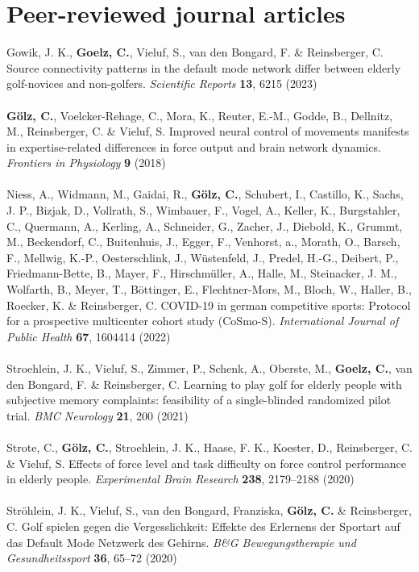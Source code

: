 \section*{Peer-reviewed journal articles}
Gowik, J. K., \textbf{Goelz, C.}, Vieluf, S., van den Bongard, F. \& Reinsberger, C. Source connectivity patterns in the default mode network differ between elderly golf-novices and non-golfers. \textit{Scientific Reports} \textbf{13}, 6215 (2023)\\
\\
\noindent\textbf{Gölz, C.}, Voelcker-Rehage, C., Mora, K., Reuter, E.-M., Godde, B., Dellnitz, M., Reinsberger, C. \& Vieluf, S. Improved neural control of movements manifests in expertise-related differences in force output and brain network dynamics. \textit{Frontiers in Physiology} \textbf{9} (2018)\\
\\
Niess, A., Widmann, M., Gaidai, R., \textbf{Gölz, C.}, Schubert, I., Castillo, K., Sachs, J. P., Bizjak, D., Vollrath, S., Wimbauer, F., Vogel, A., Keller, K., Burgstahler, C., Quermann, A., Kerling, A., Schneider, G., Zacher, J., Diebold, K., Grummt, M., Beckendorf, C., Buitenhuis, J., Egger, F., Venhorst, a., Morath, O., Barsch, F., Mellwig, K.-P., Oesterschlink, J., Wüstenfeld, J., Predel, H.-G., Deibert, P., Friedmann-Bette, B., Mayer, F., Hirschmüller, A., Halle, M., Steinacker, J. M., Wolfarth, B., Meyer, T., Böttinger, E., Flechtner-Mors, M., Bloch, W., Haller, B., Roecker, K. \& Reinsberger, C. COVID-19 in german competitive sports: Protocol for a prospective multicenter cohort study (CoSmo-S). \textit{International Journal of Public Health} \textbf{67}, 1604414 (2022)\\
\\
Stroehlein, J. K., Vieluf, S., Zimmer, P., Schenk, A., Oberste, M., \textbf{Goelz, C.}, van den Bongard, F. \& Reinsberger, C. Learning to play golf for elderly people with subjective memory complaints: feasibility of a single-blinded randomized pilot trial. \textit{BMC Neurology} \textbf{21}, 200 (2021)\\
\\
Strote, C., \textbf{Gölz, C.}, Stroehlein, J. K., Haase, F. K., Koester, D., Reinsberger, C. \& Vieluf, S. Effects of force level and task difficulty on force control performance in elderly people. \textit{Experimental Brain Research} \textbf{238}, 2179--2188 (2020)\\
\\
Ströhlein, J. K., Vieluf, S., van den Bongard, Franziska, \textbf{Gölz, C.} \& Reinsberger, C. Golf spielen gegen die Vergesslichkeit: Effekte des Erlernens der Sportart auf das Default Mode Netzwerk des Gehirns. \textit{B\&G Bewegungstherapie und Gesundheitssport} \textbf{36}, 65--72 (2020)

